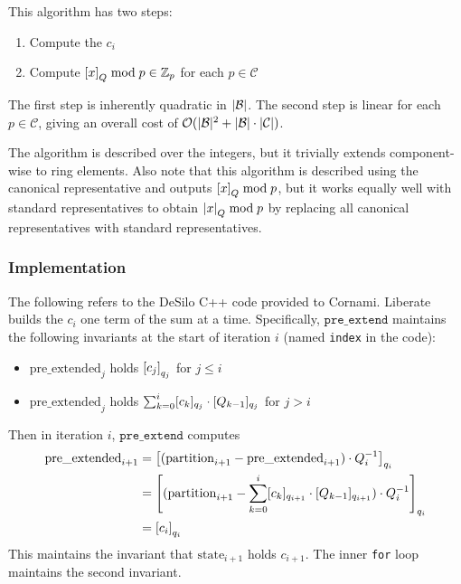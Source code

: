 \documentclass[../keyswitching.tex]{subfiles}
\begin{document}
This algorithm has two steps:
\begin{enumerate}
	\item Compute the $c_i$
	\item Compute $\bracks*{x}_Q\bmod p\in\Z_p$ for each $p\in \mathcal{C}$
\end{enumerate}
The first step is inherently quadratic in $\abs{\mathcal{B}}$. The second step is linear for each $p\in\mathcal{C}$, giving an overall cost of $\mathcal{O}(\abs{\mathcal{B}}^2+\abs{\mathcal{B}}\cdot \abs{\mathcal{C}})$.

The algorithm is described over the integers, but it trivially extends component-wise to ring elements. Also note that this algorithm is described using the canonical representative and outputs $\bracks*{x}_Q\bmod p$, but it works equally well with standard representatives to obtain $\abs*{x}_Q\bmod p$ by replacing all canonical representatives with standard representatives.

\subsubsection{Implementation}
The following refers to the DeSilo C++ code provided to Cornami.
Liberate builds the $c_i$ one term of the sum at a time. Specifically, $\texttt{pre\_extend}$ maintains the following invariants at the start of iteration $i$ (named \texttt{index} in the code):
\begin{itemize}
	\item $\mathrm{pre\_extended}_j$ holds $\bracks*{c_j}_{q_j}$ for $j \le i$
	\item $\mathrm{pre\_extended}_j$ holds $\sum_{k=0}^i \bracks{c_k}_{q_j}\cdot\bracks{Q_{k-1}}_{q_j}$ for $j > i$
\end{itemize}

Then in iteration $i$, $\texttt{pre\_extend}$ computes 
\begin{align*}
	\mathrm{pre\_extended}_{i+1} &= \bracks*{(\mathrm{partition}_{i+1} - \mathrm{pre\_extended}_{i+1})\cdot Q_{i}^{-1}}_{q_i} \\
	&= \bracks*{(\mathrm{partition}_{i+1} - \sum_{k=0}^i \bracks{c_k}_{q_{i+1}}\cdot\bracks{Q_{k-1}}_{q_{i+1}})\cdot Q_{i}^{-1}}_{q_i} \\
	&= \bracks*{c_i}_{q_i}
\end{align*}
This maintains the invariant that $\mathrm{state}_{i+1}$ holds $c_{i+1}$. The inner \texttt{for} loop maintains the second invariant. 
\end{document}
